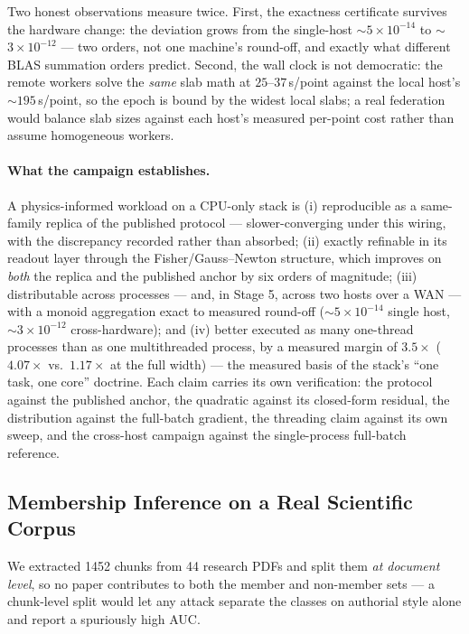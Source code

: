 \documentclass[11pt,a4paper]{article}
\theoremstyle{plain}
\theoremstyle{definition}
\begin{document}
Two honest observations measure twice. First, the exactness certificate
survives the hardware change: the deviation grows from the single-host
$\sim$$5\times10^{-14}$ to $\sim$$3\times10^{-12}$ --- two orders, not
one machine's round-off, and exactly what different BLAS summation
orders predict. Second, the wall clock is not democratic: the remote
workers solve the \emph{same} slab math at $25$--$37$\,\textmu s/point
against the local host's $\sim$$195$\,\textmu s/point, so the epoch is
bound by the widest local slabs; a real federation would balance slab
sizes against each host's measured per-point cost rather than assume
homogeneous workers.

\paragraph{What the campaign establishes.}
A physics-informed workload on a CPU-only stack is (i) reproducible as a
same-family replica of the published protocol --- slower-converging
under this wiring, with the discrepancy recorded rather than absorbed;
(ii) exactly refinable in its readout layer through the
Fisher/Gauss--Newton structure, which improves on \emph{both} the replica
and the published anchor by six orders of magnitude; (iii) distributable
across processes --- and, in Stage 5, across two hosts over a WAN --- with
a monoid aggregation exact to measured round-off ($\sim$$5\times10^{-14}$
single host, $\sim$$3\times10^{-12}$ cross-hardware); and (iv) better
executed as many one-thread
processes than as one multithreaded process, by a measured margin of
$3.5\times$ ($4.07\times$ vs.\ $1.17\times$ at the full width) --- the
measured basis of the stack's ``one task, one core'' doctrine.  Each
claim carries its own verification: the protocol against the published
anchor, the quadratic against its closed-form residual, the distribution
against the full-batch gradient, the threading claim against its own
sweep, and the cross-host campaign against the single-process
full-batch reference.



\subsection{Membership Inference on a Real Scientific Corpus}

We extracted 1452 chunks from 44 research PDFs and split them
\emph{at document level}, so no paper contributes to both the member and
non-member sets --- a chunk-level split would let any attack separate the
classes on authorial style alone and report a spuriously high AUC.
\end{document}
